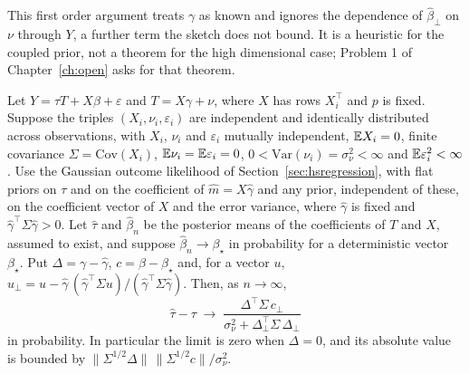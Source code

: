 This first order argument treats $\gamma$ as known and ignores the dependence of $\hat\beta_\perp$ on $\nu$ through $Y$, a further term the sketch does not bound. It is a heuristic for the coupled prior, not a theorem for the high dimensional case; Problem 1 of Chapter~\ref{ch:open} asks for that theorem.



\begin{proposition}\label{ss:prop:product}
Let $Y = \tau T + X\beta + \varepsilon$ and $T = X\gamma + \nu$, where $X$ has rows $X_i^\top$ and $p$ is fixed. Suppose the triples $(X_i,\nu_i,\varepsilon_i)$ are independent and identically distributed across observations, with $X_i$, $\nu_i$ and $\varepsilon_i$ mutually independent, $\mathbb{E} X_i = 0$, finite covariance $\Sigma = \mathrm{Cov}(X_i)$, $\mathbb{E}\nu_i = \mathbb{E}\varepsilon_i = 0$, $0 < \mathrm{Var}(\nu_i) = \sigma_\nu^2 < \infty$ and $\mathbb{E}\varepsilon_i^2 < \infty$. Use the Gaussian outcome likelihood of Section~\ref{sec:hsregression}, with flat priors on $\tau$ and on the coefficient of $\hat m = X\hat\gamma$ and any prior, independent of these, on the coefficient vector of $X$ and the error variance, where $\hat\gamma$ is fixed and $\hat\gamma^\top\Sigma\hat\gamma > 0$. Let $\hat\tau$ and $\hat\beta_n$ be the posterior means of the coefficients of $T$ and $X$, assumed to exist, and suppose $\hat\beta_n \to \beta_\star$ in probability for a deterministic vector $\beta_\star$. Put $\Delta = \gamma - \hat\gamma$, $c = \beta - \beta_\star$ and, for a vector $u$, $u_\perp = u - \hat\gamma\,(\hat\gamma^\top\Sigma u)/(\hat\gamma^\top\Sigma\hat\gamma)$. Then, as $n\to\infty$,
\[
\hat\tau - \tau \;\longrightarrow\; \frac{\Delta^\top\Sigma\, c_\perp}{\sigma_\nu^2 + \Delta_\perp^\top\Sigma\,\Delta_\perp}
\]
in probability. In particular the limit is zero when $\Delta = 0$, and its absolute value is bounded by $\|\Sigma^{1/2}\Delta\|\,\|\Sigma^{1/2}c\|/\sigma_\nu^2$.
\end{proposition}

